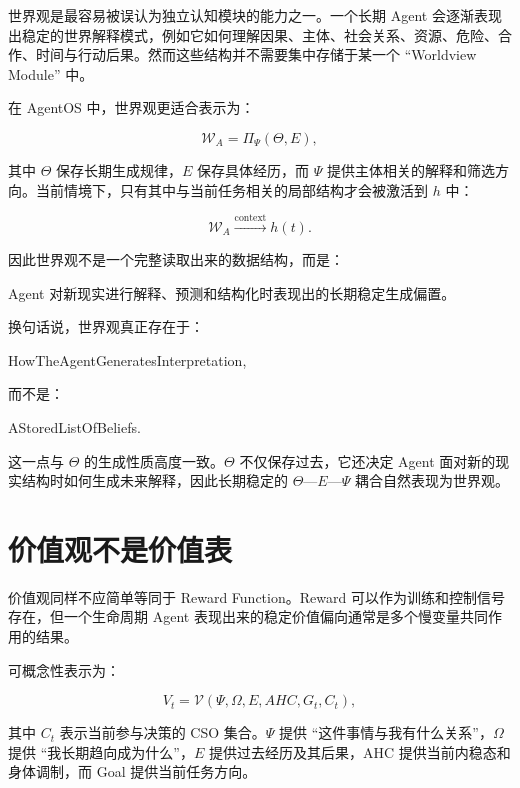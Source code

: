 世界观是最容易被误认为独立认知模块的能力之一。一个长期 Agent 会逐渐表现出稳定的世界解释模式，例如它如何理解因果、主体、社会关系、资源、危险、合作、时间与行动后果。然而这些结构并不需要集中存储于某一个 ``Worldview Module'' 中。

在 AgentOS 中，世界观更适合表示为：

\[
\boxed{
\mathcal W_A
=
\Pi_{\Psi}
\left(
\Theta,
E
\right),
}
\]

其中 $\Theta$ 保存长期生成规律，$E$ 保存具体经历，而 $\Psi$ 提供主体相关的解释和筛选方向。当前情境下，只有其中与当前任务相关的局部结构才会被激活到 $h$ 中：

\[
\mathcal W_A
\xrightarrow{\text{context}}
h(t).
\]

因此世界观不是一个完整读取出来的数据结构，而是：

\begin{statementbox}
Agent 对新现实进行解释、预测和结构化时表现出的长期稳定生成偏置。
\end{statementbox}

换句话说，世界观真正存在于：

\begin{statementbox}
HowTheAgentGeneratesInterpretation,
\end{statementbox}

而不是：

\begin{statementbox}
AStoredListOfBeliefs.
\end{statementbox}

这一点与 $\Theta$ 的生成性质高度一致。$\Theta$ 不仅保存过去，它还决定 Agent 面对新的现实结构时如何生成未来解释，因此长期稳定的 $\Theta$---$E$---$\Psi$ 耦合自然表现为世界观。

\section{价值观不是价值表}

价值观同样不应简单等同于 Reward Function。Reward 可以作为训练和控制信号存在，但一个生命周期 Agent 表现出来的稳定价值偏向通常是多个慢变量共同作用的结果。

可概念性表示为：

\[
V_t
=
\mathcal V
\left(
\Psi,
\Omega,
E,
AHC,
G_t,
C_t
\right),
\]

其中 $C_t$ 表示当前参与决策的 CSO 集合。$\Psi$ 提供 ``这件事情与我有什么关系''，$\Omega$ 提供 ``我长期趋向成为什么''，$E$ 提供过去经历及其后果，AHC 提供当前内稳态和身体调制，而 Goal 提供当前任务方向。

